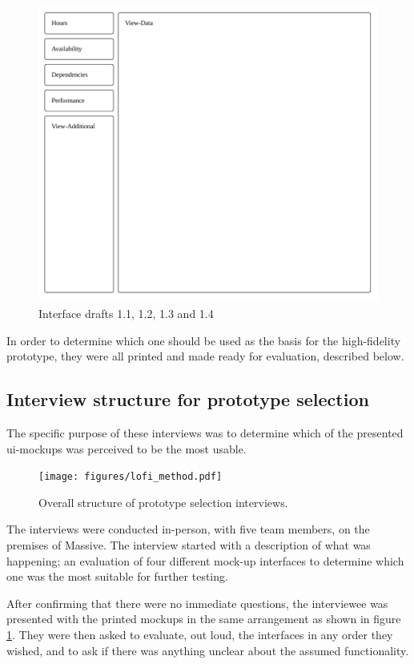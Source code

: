{\begin{figure}[h!]
      \includegraphics[valign=t,trim={.25cm .35cm .30cm .25cm},clip,width=.49\linewidth]{ui14.pdf}
      \caption{Interface drafts 1.1, 1.2, 1.3 and 1.4}
      \label{label_mockupInterfaces}
    \end{figure}

  In order to determine which one should be used as the
  basis for the high-fidelity prototype, they were all printed and made ready
  for evaluation, described below.

  \subsection{Interview structure for prototype selection}


    The specific purpose of these interviews was to determine which of the
    presented ui-mockups was perceived to be the most usable.

    \begin{figure}[h!]
      \centering
      \texttt{[image: figures/lofi\_method.pdf]}
      \caption{Overall structure of prototype selection interviews.}
    \end{figure}

    The interviews were conducted in-person, with five team members, on
    the premises of Massive. The interview started with a description of
    what was happening; an evaluation of four different mock-up interfaces
    to determine which one was the most suitable for further testing.

    After confirming that there were no immediate questions, the
    interviewee was presented with the printed mockups in the same
    arrangement as shown in figure \ref{label_mockupInterfaces}. They were
    then asked to evaluate, out loud, the interfaces in any order they
    wished, and to ask if there was anything unclear about the assumed
    functionality.

}
